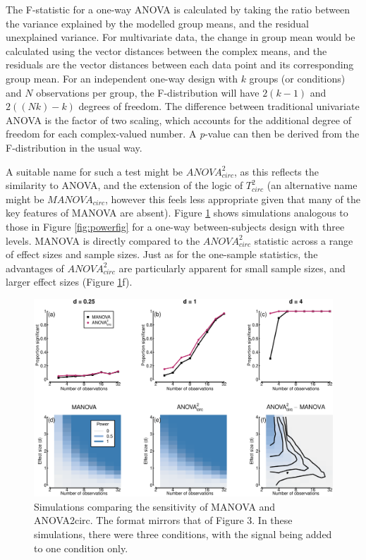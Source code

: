 \documentclass[]{article}
\begin{document}
The F-statistic for a one-way ANOVA is calculated by taking the ratio between the variance explained by the modelled group means, and the residual unexplained variance. For multivariate data, the change in group mean would be calculated using the vector distances between the complex means, and the residuals are the vector distances between each data point and its corresponding group mean. For an independent one-way design with \(k\) groups (or conditions) and \(N\) observations per group, the F-distribution will have \(2(k-1)\) and \(2((Nk)-k)\) degrees of freedom. The difference between traditional univariate ANOVA is the factor of two scaling, which accounts for the additional degree of freedom for each complex-valued number. A \emph{p}-value can then be derived from the F-distribution in the usual way.

A suitable name for such a test might be \({ANOVA}^2_{circ}\), as this reflects the similarity to ANOVA, and the extension of the logic of \(T^2_{circ}\) (an alternative name might be \(MANOVA_{circ}\), however this feels less appropriate given that many of the key features of MANOVA are absent). Figure \ref{fig:powerfig2} shows simulations analogous to those in Figure \ref{fig:powerfig} for a one-way between-subjects design with three levels. MANOVA is directly compared to the \({ANOVA}^2_{circ}\) statistic across a range of effect sizes and sample sizes. Just as for the one-sample statistics, the advantages of \({ANOVA}^2_{circ}\) are particularly apparent for small sample sizes, and larger effect sizes (Figure \ref{fig:powerfig2}f).

\begin{figure}

{\centering \includegraphics{manuscript_files/figure-latex/powerfig2-1} 

}

\caption{Simulations comparing the sensitivity of MANOVA and ANOVA2circ. The format mirrors that of Figure 3. In these simulations, there were three conditions, with the signal being added to one condition only.}\label{fig:powerfig2}
\end{figure}
\end{document}

